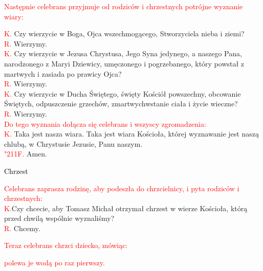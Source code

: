 \documentclass[11pt, a5paper]{extarticle}
\newcommand{\textjuni}[1]{{\fontspec{Junicode}#1}}
\newcommand{\response}{\textcolor{red}{\textjuni{\char"211F. }}}
\begin{document}
\textcolor{red}{Następnie celebrans przyjmuje od rodziców i chrzestnych potrójne wyznanie wiary:}

\textcolor{red}{K.} Czy wierzycie w Boga, Ojca wszechmogącego, Stworzyciela nieba i ziemi?  \\
\textcolor{red}{R.} Wierzymy. \\
\textcolor{red}{K.} Czy wierzycie w Jezusa Chrystusa, Jego Syna jedynego, a naszego Pana, narodzonego z Maryi Dziewicy, umęczonego i pogrzebanego, który powstał z martwych i zasiada po prawicy Ojca?  \\
\textcolor{red}{R.} Wierzymy. \\
\textcolor{red}{K.} Czy wierzycie w Ducha Świętego, święty Kościół powszechny, obcowanie Świętych, odpuszczenie grzechów, zmartwychwstanie ciała i życie wieczne?  \\
\textcolor{red}{R.} Wierzymy. \\

\textcolor{red}{Do tego wyznania dołącza się celebrans i wszyscy zgromadzenia:} \\
\textcolor{red}{K.} Taka jest nasza wiara. Taka jest wiara Kościoła, której wyznawanie jest naszą chlubą, w Chrystusie Jezusie, Panu naszym. \\
\response Amen. \\

\begin{center}
\Large
\noindent\textcolor{black}{Chrzest}
\end{center}

\textcolor{red}{Celebrans zaprasza rodzinę, aby podeszła do chrzcielnicy, i pyta rodziców i chrzestnych:} \\
\textcolor{red}{K.}Czy chcecie, aby Tomasz Michał otrzymał chrzest w wierze Kościoła, którą przed chwilą wspólnie wyznaliśmy? \\
\textcolor{red}{R.} Chcemy. \\

\begin{center}
\textcolor{red}{Teraz celebrans chrzci dziecko, mówiąc:}
\end{center}

\begin{Parallel}[v]{0.485\textwidth}{0.485\textwidth}
\end{Parallel}

\begin{center}
\textcolor{red}{polewa je wodą po raz pierwszy.}
\end{center}
\end{document}
